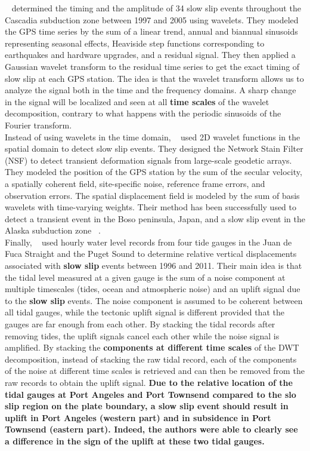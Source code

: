 \documentclass{article}
\begin{document}
~\citet{SZE_2008} determined the timing and the amplitude of 34 slow slip events throughout the Cascadia subduction zone between 1997 and 2005 using wavelets. They modeled the GPS time series by the sum of a linear trend, annual and biannual sinusoids representing seasonal effects, Heaviside step functions corresponding to earthquakes and hardware upgrades, and a residual signal. They then applied a Gaussian wavelet transform to the residual time series to get the exact timing of slow slip at each GPS station. The idea is that the wavelet transform allows us to analyze the signal both in the time and the frequency domains. A sharp change in the signal will be localized and seen at all \textbf{time scales} of the wavelet decomposition, contrary to what happens with the periodic sinusoids of the Fourier transform. \\

Instead of using wavelets in the time domain, ~\citet{OHT_2010} used 2D wavelet functions in the spatial domain to detect slow slip events. They designed the Network Stain Filter (NSF) to detect transient deformation signals from large-scale geodetic arrays. They modeled the position of the GPS station by the sum of the secular velocity, a spatially coherent field, site-specific noise, reference frame errors, and observation errors. The spatial displacement field is modeled by the sum of basis wavelets with time-varying weights.  Their method has been successfully used to detect a transient event in the Boso peninsula, Japan, and a slow slip event in the Alaska subduction zone ~\citep{WEI_2012}. \\

Finally, ~\citet{ALB_2019} used hourly water level records from four tide gauges in the Juan de Fuca Straight and the Puget Sound to determine relative vertical displacements associated with \textbf{slow slip} events between 1996 and 2011. Their main idea is that the tidal level measured at a given gauge is the sum of a noise component at multiple timescales (tides, ocean and atmospheric noise) and an uplift signal due to the \textbf{slow slip} events. The noise component is assumed to be coherent between all tidal gauges, while the tectonic uplift signal is different provided that the gauges are far enough from each other. By stacking the tidal records after removing tides, the uplift signals cancel each other while the noise signal is amplified. By stacking the \textbf{components at different time scales} of the DWT decomposition, instead of stacking the raw tidal record, each of the components of the noise at different time scales is retrieved and can then be removed from the raw records to obtain the uplift signal. \textbf{Due to the relative location of the tidal gauges at Port Angeles and Port Townsend compared to the slo slip region on the plate boundary, a slow slip event should result in uplift in Port Angeles (western part) and in subsidence in Port Townsend (eastern part). Indeed, the authors were able to clearly see a difference in the sign of the uplift at these two tidal gauges.} \\
\end{document}
